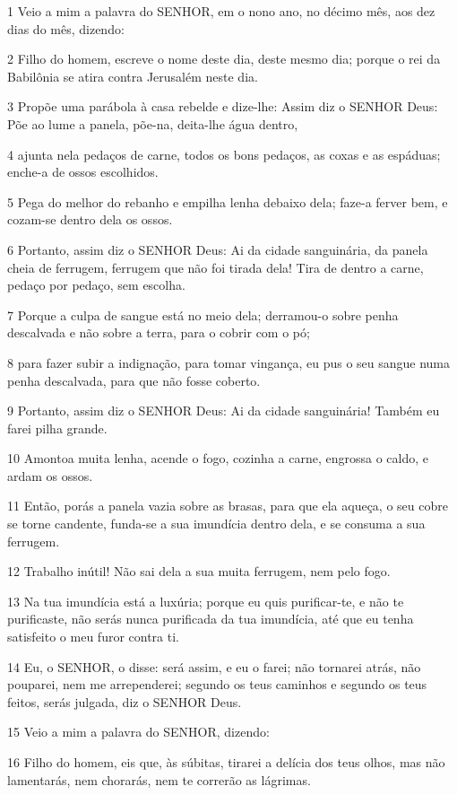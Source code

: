 \par 1 Veio a mim a palavra do SENHOR, em o nono ano, no décimo mês, aos dez dias do mês, dizendo:
\par 2 Filho do homem, escreve o nome deste dia, deste mesmo dia; porque o rei da Babilônia se atira contra Jerusalém neste dia.
\par 3 Propõe uma parábola à casa rebelde e dize-lhe: Assim diz o SENHOR Deus: Põe ao lume a panela, põe-na, deita-lhe água dentro,
\par 4 ajunta nela pedaços de carne, todos os bons pedaços, as coxas e as espáduas; enche-a de ossos escolhidos.
\par 5 Pega do melhor do rebanho e empilha lenha debaixo dela; faze-a ferver bem, e cozam-se dentro dela os ossos.
\par 6 Portanto, assim diz o SENHOR Deus: Ai da cidade sanguinária, da panela cheia de ferrugem, ferrugem que não foi tirada dela! Tira de dentro a carne, pedaço por pedaço, sem escolha.
\par 7 Porque a culpa de sangue está no meio dela; derramou-o sobre penha descalvada e não sobre a terra, para o cobrir com o pó;
\par 8 para fazer subir a indignação, para tomar vingança, eu pus o seu sangue numa penha descalvada, para que não fosse coberto.
\par 9 Portanto, assim diz o SENHOR Deus: Ai da cidade sanguinária! Também eu farei pilha grande.
\par 10 Amontoa muita lenha, acende o fogo, cozinha a carne, engrossa o caldo, e ardam os ossos.
\par 11 Então, porás a panela vazia sobre as brasas, para que ela aqueça, o seu cobre se torne candente, funda-se a sua imundícia dentro dela, e se consuma a sua ferrugem.
\par 12 Trabalho inútil! Não sai dela a sua muita ferrugem, nem pelo fogo.
\par 13 Na tua imundícia está a luxúria; porque eu quis purificar-te, e não te purificaste, não serás nunca purificada da tua imundícia, até que eu tenha satisfeito o meu furor contra ti.
\par 14 Eu, o SENHOR, o disse: será assim, e eu o farei; não tornarei atrás, não pouparei, nem me arrependerei; segundo os teus caminhos e segundo os teus feitos, serás julgada, diz o SENHOR Deus.
\par 15 Veio a mim a palavra do SENHOR, dizendo:
\par 16 Filho do homem, eis que, às súbitas, tirarei a delícia dos teus olhos, mas não lamentarás, nem chorarás, nem te correrão as lágrimas.
